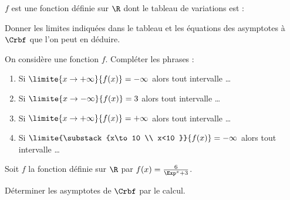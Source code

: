 \begin{exr}
$f$ est une fonction définie sur $\R$ dont le tableau de variations est :

	
	Donner les limites indiquées dans le tableau et les équations des  asymptotes à $\Crbf$ que l'on peut en déduire.
 \end{exr}
%
%
%
\begin{exr}On considère une fonction $f$. Compléter les phrases :
	\begin{enumerate}
	\item Si $\limite{x\to +\infty}{f(x)}=-\infty$ alors tout intervalle  \dots
	\item Si $\limite{x\to -\infty}{f(x)}=3$ alors tout intervalle  \dots
	\item Si $\limite{x\to +\infty}{f(x)}=+\infty$ alors tout intervalle  \dots
	\item Si $\limite{\substack{x\to 10 \\ x<10 }}{f(x)}=-\infty$ alors tout intervalle  \dots
	\end{enumerate}
\end{exr}
%
%
%
\begin{exr}
Soit $f$ la fonction définie sur $\R$ par $f(x)=\frac{6}{\Exp^x+3}$.

Déterminer les asymptotes de $\Crbf$ par le calcul.
\end{exr}
%
%
%

